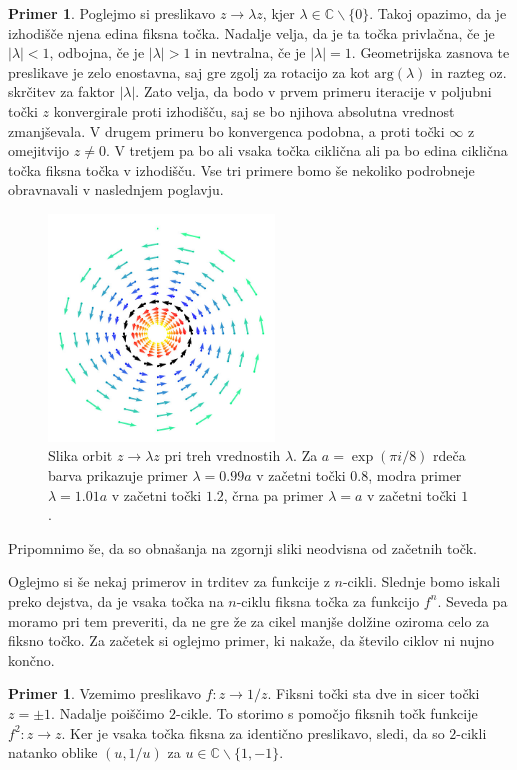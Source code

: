 \documentclass[12pt,a4paper]{amsart}
\theoremstyle{definition} %
\newtheorem{primer}[definicija]{Primer}
\theoremstyle{plain} %
\newcommand{\CC}{\mathbb C}
\begin{document}
\begin{primer}\label{pr:LinearDynamicsIntro}
Poglejmo si preslikavo $z \to \lambda z$, kjer $\lambda\in\mathbb{C}\smallsetminus\{0\}$.
Takoj opazimo, da je izhodišče njena edina fiksna točka. 
Nadalje velja, da je ta točka privlačna, če je $|\lambda| < 1$,
odbojna, če je $|\lambda| > 1$ in nevtralna, če je $|\lambda| = 1$.
Geometrijska zasnova te preslikave je zelo enostavna, 
saj gre zgolj za rotacijo za kot $\textrm{arg}(\lambda)$ in razteg oz. skrčitev za faktor $|\lambda|$. 
Zato velja, da bodo v prvem primeru iteracije v poljubni točki $z$ konvergirale proti izhodišču,
saj se bo njihova absolutna vrednost zmanjševala.
V drugem primeru bo konvergenca podobna, a proti točki $\infty$ z omejitvijo $z\neq0$.
V tretjem pa bo ali vsaka točka ciklična ali pa bo edina ciklična točka fiksna točka v izhodišču.
Vse tri primere bomo še nekoliko podrobneje obravnavali v naslednjem poglavju.

\begin{figure}[h]
\includegraphics[width=6cm]{graphics/LinearOrbitTrichotomy2.jpg}
\caption{
Slika orbit $z \to \lambda z$ pri treh vrednostih $\lambda$.
Za $a = \exp(\pi i / 8)$ rdeča barva prikazuje primer $\lambda = 0.99 a$ v začetni točki $0.8$,
modra primer $\lambda = 1.01 a$ v začetni točki $1.2$, 
črna pa primer $\lambda = a$ v začetni točki $1$.
}
\end{figure}
\noindent Pripomnimo še, da so obnašanja na zgornji sliki neodvisna od začetnih točk.
\end{primer}
\vskip 2mm

Oglejmo si še nekaj primerov in trditev za funkcije z $n$-cikli.
Slednje bomo iskali preko dejstva, da je vsaka točka na $n$-ciklu fiksna točka za funkcijo $f^n$.
Seveda pa moramo pri tem preveriti, da ne gre že za cikel manjše dolžine oziroma celo za fiksno točko.
Za začetek si oglejmo primer, ki nakaže, da število ciklov ni nujno končno.

\begin{primer}
Vzemimo preslikavo $f \colon z \to 1/z$.
Fiksni točki sta dve in sicer točki $z=\pm1$. Nadalje poiščimo $2$-cikle.
To storimo s pomočjo fiksnih točk funkcije $f^2 \colon z \to z$.
Ker je vsaka točka fiksna za identično preslikavo, sledi, da so $2$-cikli natanko oblike $(u, 1/u)$ za $u \in \CC \smallsetminus \{1, -1\}$.
\end{primer}
\end{document}
